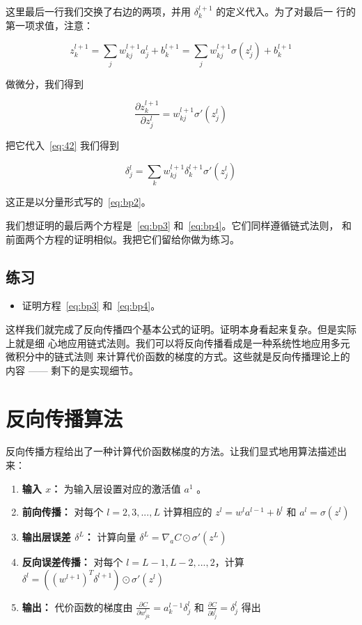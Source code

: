 这里最后一行我们交换了右边的两项，并用 $\delta^{l+1}_k$ 的定义代入。为了对最后一
行的第一项求值，注意：

\begin{equation}
  z^{l+1}_k = \sum_j w^{l+1}_{kj} a^l_j +b^{l+1}_k = \sum_j w^{l+1}_{kj} \sigma(z^l_j) +b^{l+1}_k
\label{eq:43}\tag{43}
\end{equation}

做微分，我们得到

\begin{equation}
  \frac{\partial z^{l+1}_k}{\partial z^l_j} = w^{l+1}_{kj} \sigma'(z^l_j)
\label{eq:44}\tag{44}
\end{equation}

把它代入~\eqref{eq:42} 我们得到

\begin{equation}
  \delta^l_j = \sum_k w^{l+1}_{kj}  \delta^{l+1}_k \sigma'(z^l_j)
\label{eq:45}\tag{45}
\end{equation}

这正是以分量形式写的~\eqref{eq:bp2}。

我们想证明的最后两个方程是~\eqref{eq:bp3} 和~\eqref{eq:bp4}。它们同样遵循链式法则，
和前面两个方程的证明相似。我把它们留给你做为练习。

\subsection*{练习}

\begin{itemize}
\item 证明方程~\eqref{eq:bp3} 和~\eqref{eq:bp4}。
\end{itemize}

这样我们就完成了反向传播四个基本公式的证明。证明本身看起来复杂。但是实际上就是细
心地应用链式法则。我们可以将反向传播看成是一种系统性地应用多元微积分中的链式法则
来计算代价函数的梯度的方式。这些就是反向传播理论上的内容 —— 剩下的是实现细节。

\section{反向传播算法}
\label{sec:the_backpropagation_algorithm}

反向传播方程给出了一种计算代价函数梯度的方法。让我们显式地用算法描述出来：

\begin{enumerate}
\item \textbf{输入 $x$：} 为输入层设置对应的激活值 $a^{1}$ 。
\item \textbf{前向传播：} 对每个 $l=2,3,...,L$ 计算相应的 $z^l = w^la^{l-1} +
  b^l$ 和 $a^l = \sigma(z^l)$
\item \textbf{输出层误差 $\delta^L$：} 计算向量 $\delta^L = \nabla_a C \odot
  \sigma'(z^L)$
\item \textbf{反向误差传播：} 对每个 $l=L-1, L-2,...,2$，计算
  $\delta^l = ((w^{l+1})^T\delta^{l+1})\odot \sigma'(z^l)$
\item \textbf{输出：} 代价函数的梯度由 $\frac{\partial C}{\partial w^l_{jk}} = a^{l-1}_k \delta^l_j$ 和 $\frac{\partial C}{\partial b_j^l} = \delta_j^l$ 得出
\end{enumerate}

